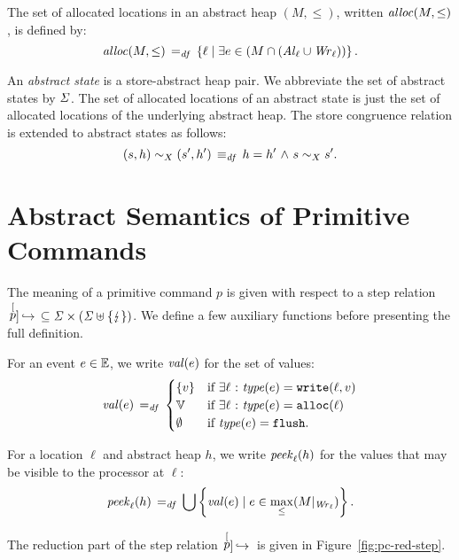 \documentclass[11pt]{report}
\begin{document}
The set of allocated locations in an abstract heap $(M,\leq)$, written $\mathit{alloc}(M,\leq)$, is defined by: \[ \mathit{alloc}(M,\leq) \operatorname{\;=_{\mathit{df}}\;} \left\lbrace \ell \mid \exists e \in (M \cap (\mathit{Al}_{\ell} \cup \mathit{Wr}_{\ell})) \right\rbrace.\] 


An \emph{abstract state} is a store-abstract heap pair. We abbreviate the set of abstract states by $\mathit{\Sigma}$. The set of allocated locations of an abstract state is just the set of allocated locations of the underlying abstract heap. The store congruence relation is extended to abstract states as follows: \[ (s,h) \sim_{X} (s',h') \operatorname{\;\equiv_{\mathit{df}}\;} h = h' \operatorname{\,\wedge\,} s \sim_{X} s'. \] 


\section{Abstract Semantics of Primitive Commands} %
\label{sec:abstract_semantics_of_primitive_commands}

The meaning of a primitive command $p$ is given with respect to a step relation  $\,\stackrel[p]{}{\,\hookrightarrow}\, \subseteq \mathit{\Sigma} \times (\mathit{\Sigma} \uplus \left\lbrace \lightning \right\rbrace)$. We define a few auxiliary functions before presenting the full definition. 

For an event $e \in \mathbb{E}$, we write $\mathit{val}(e)$ for the set of values: \[ \mathit{val}(e) \operatorname{\;=_{\mathit{df}}\;} \begin{cases}
	\left\lbrace v \right\rbrace & \text{if $\exists \ell \operatorname{\,:\,} \mathit{type}(e) = \mathtt{write}(\ell,v)$} \\
	\mathbb{V} & \text{if $\exists \ell \operatorname{\,:\,} \mathit{type}(e) = \mathtt{alloc}(\ell)$} \\
	\operatorname{\emptyset} & \text{if $\mathit{type}(e) = \mathtt{flush}$.}
\end{cases}\] 

For a location $\ell$ and abstract heap $h$, we write $\mathit{peek}_{\ell}(h)$ for the values that may be visible to the processor at $\ell$: \begin{equation}
	\label{eq:speek}
	\mathit{peek}_{\ell}(h) \operatorname{\;=_{\mathit{df}}\;}
		\bigcup \left\lbrace \mathit{val}(e) \mid e \in \max_\leq(M |_{\mathit{Wr}_{\ell}}) \right\rbrace.
\end{equation}

The reduction part of the step relation $\,\stackrel[p]{}{\,\hookrightarrow}\,$ is given in Figure~\ref{fig:pc-red-step}. 
\end{document}
